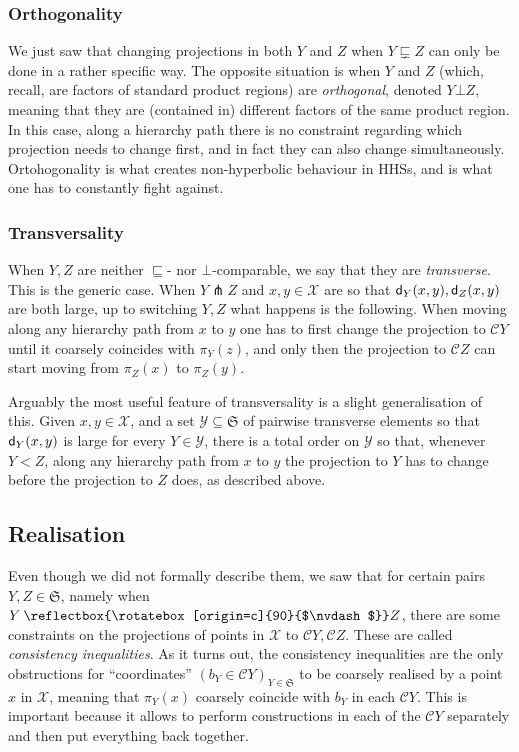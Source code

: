 \documentclass[11pt,oneside]{amsart}
\def\notorth{\:\ensuremath{\reflectbox{\rotatebox[origin=c]{90}{$\nvdash$}}}}
\theoremstyle{definition}
\newcommand{\dist}{\textup{\textsf{d}}}
\newcommand{\cuco}[1]{{\mathcal #1}}
\newcommand{\fontact}{{\mathcal C}}
\newcommand{\nest}{\sqsubseteq}
\newcommand{\propnest}{\sqsubsetneq}
\newcommand{\orth}{\bot}
\newcommand{\transverse}{\pitchfork}
\begin{document}
\subsubsection{Orthogonality} We just saw that changing projections in both $Y$ and $Z$ when $Y\propnest Z$ can only be done in a rather specific way. The opposite situation is when $Y$ and $Z$ (which, recall, are factors of standard product regions) are \emph{orthogonal}, denoted $Y\orth Z$, meaning that they are (contained in) different factors of the same product region.  In this case, along a hierarchy path there is no constraint regarding which projection needs to change first, and in fact they can also change simultaneously. Ortohogonality is what creates non-hyperbolic behaviour in HHSs, and is what one has to constantly fight against.

\subsubsection{Transversality} When $Y,Z$ are neither $\nest$- nor $\orth$-comparable, we say that they are \emph{transverse}. This is the generic case. When $Y\transverse Z$ and $x,y\in\cuco X$ are so that $\dist_Y(x,y),\dist_Z(x,y)$ are both large, up to switching $Y,Z$ what happens is the following. When moving along any hierarchy path from $x$ to $y$ one has to first change the projection to $\fontact Y$ until it coarsely coincides with $\pi_Y(z)$, and only then the projection to $\fontact Z$ can start moving from $\pi_Z(x)$ to $\pi_Z(y)$.

Arguably the most useful feature of transversality is a slight generalisation of this. Given $x,y\in\cuco X$, and a set $\mathcal Y\subseteq \mathfrak S$ of pairwise transverse elements so that $\dist_{Y}(x,y)$ is large for every $Y\in\mathcal Y$, there is a total order on $\mathcal Y$ so that, whenever $Y<Z$, along any hierarchy path from $x$ to $y$ the projection to $Y$ has to change before the projection to $Z$ does, as described above.

\subsection{Realisation}

Even though we did not formally describe them, we saw that for certain pairs $Y,Z\in\mathfrak S$, namely when $Y\notorth Z$, there are some constraints on the projections of points in $\cuco X$ to $\fontact Y,\fontact Z$. These are called \emph{consistency inequalities}. As it turns out, the consistency inequalities are the only obstructions for ``coordinates'' $(b_Y\in\fontact Y)_{Y\in\mathfrak S}$ to be coarsely realised by a point $x$ in $\cuco X$, meaning that $\pi_Y(x)$ coarsely coincide with $b_Y$ in each $\fontact Y$. This is important because it allows to perform constructions in each of the $\fontact Y$ separately and then put everything back together. 
\end{document}
